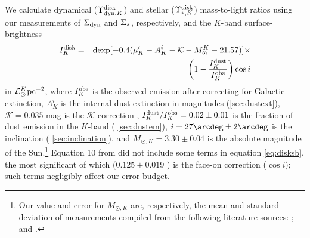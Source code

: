 \documentclass[apj,iop,numberedappendix]{emulateapj}
\begin{document}
We calculate dynamical ($\Upsilon_{{\rm dyn},K}^{\rm disk}$) and stellar ($\Upsilon_{\ast,K}^{\rm disk}$) mass-to-light
ratios using our measurements of $\Sigma_{\rm dyn}$ and $\Sigma_{\rm \ast}$, respectively, and the
$K$-band surface-brightness
%
\begin{eqnarray}
%
I^{\rm disk}_K & = & {\rm dexp}[-0.4(\mu^{\prime}_K - A^i_K - {\mathcal K} -
M_{\odot}^K - 21.57)] \times \nonumber \\
& & \left(1-\frac{I_K^{\rm dust}}{I_K^{\rm obs}}\right)\cos i
%
\label{eq:disksb}
%
\end{eqnarray}
%
in $\mathcal{L}_\odot^K {\rm pc}^{-2}$, where $I_K^{\rm obs}$ is the observed emission after
correcting for Galactic extinction, $A^i_K$ is the internal dust extinction in
magnitudes (\sect \ref{sec:dustext}), ${\mathcal K} = 0.035$ mag is the
${\mathcal K}$-correction \citep{1995AJ....109...87B}, $I_K^{\rm dust}/I_K^{\rm
obs} = 0.02\pm0.01$ is the fraction of dust emission in the $K$-band (\sect
\ref{sec:dustem}), $i=27\arcdeg\pm2\arcdeg$ is the inclination (\sect
\ref{sec:inclination}), and $M_{\odot,K} = 3.30\pm0.04$ is the absolute
magnitude of the Sun.\footnote{
%
Our value and error for $M_{\odot,K}$ are, respectively, the mean and standard
deviation of measurements compiled from the following literature sources:
\citet{1994ApJS...95..107W, 1998gaas.book.....B, 2001ApJ...550..212B,
2003ApJS..149..289B}; and \citet{2004MNRAS.347..691P}.
%
}  Equation 10 from  did not include some terms
in equation \ref{eq:disksb}, the most significant of which ($0.125\pm0.019$
\muu) is the face-on correction ($\cos i$); such terms negligibly affect our
error budget.
\end{document}

